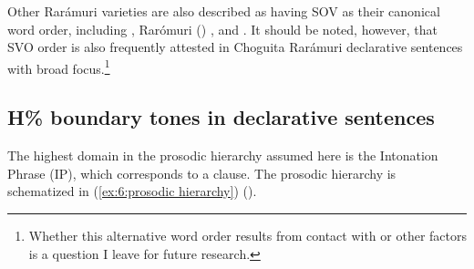     \label{ex: canonical SOV word ordera}
        \label{ex: canonical SOV word orderb}
    \z
\z

Other Rarámuri varieties are also described as having SOV as their canonical word order, including  \citep{Burgess-1984}, Rarómuri () \citep{valdez2014predication},  \citep{estrada2013complementos} and  \citep{moralesmoreno2016rochecahi}. It should be noted, however, that SVO order is also frequently attested in Choguita Rarámuri declarative sentences with broad focus.\footnote{Whether this alternative word order results from contact with  or other factors is a question I leave for future research.}

\subsection{H\% boundary tones in declarative sentences}
\label{subsec: H boundary tones}

The highest domain in the prosodic hierarchy assumed here is the Intonation Phrase (IP), which corresponds to a clause. The prosodic hierarchy is schematized in (\ref{ex:6:prosodic hierarchy}) (\citealt{selkirk1980prosodic, selkirk1996prosodic, nespor1986prosodic, hayes1989prosodic}).


